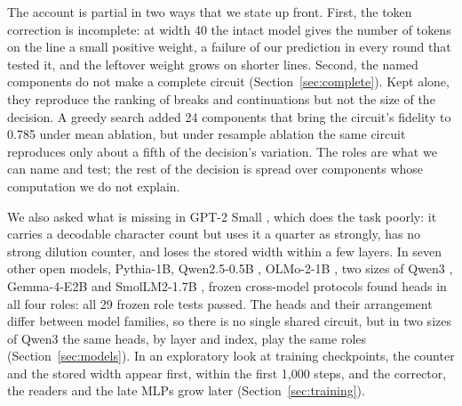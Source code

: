 \documentclass[11pt,a4paper]{article}
\begin{document}
The account is partial in two ways that we state up front. First, the token correction is incomplete: at width 40 the intact model gives the number of tokens on the line a small positive weight, a failure of our prediction in every round that tested it, and the leftover weight grows on shorter lines. Second, the named components do not make a complete circuit (Section~\ref{sec:complete}). Kept alone, they reproduce the ranking of breaks and continuations but not the size of the decision. A greedy search added 24 components that bring the circuit's fidelity to 0.785 under mean ablation, but under resample ablation the same circuit reproduces only about a fifth of the decision's variation. The roles are what we can name and test; the rest of the decision is spread over components whose computation we do not explain.

We also asked what is missing in GPT-2 Small \citep{radford2019language}, which does the task poorly: it carries a decodable character count but uses it a quarter as strongly, has no strong dilution counter, and loses the stored width within a few layers. In seven other open models, Pythia-1B, Qwen2.5-0.5B \citep{qwen2024qwen25}, OLMo-2-1B \citep{olmo2024olmo2}, two sizes of Qwen3 \citep{qwen2025qwen3}, Gemma-4-E2B \citep{gemma2026gemma4} and SmolLM2-1.7B \citep{benallal2025smollm2}, frozen cross-model protocols found heads in all four roles: all 29 frozen role tests passed. The heads and their arrangement differ between model families, so there is no single shared circuit, but in two sizes of Qwen3 the same heads, by layer and index, play the same roles (Section~\ref{sec:models}). In an exploratory look at training checkpoints, the counter and the stored width appear first, within the first 1,000 steps, and the corrector, the readers and the late MLPs grow later (Section~\ref{sec:training}).
\end{document}
